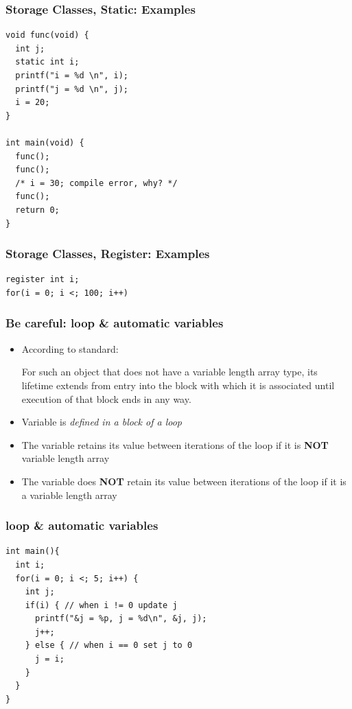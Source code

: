 \documentclass{../c-lecture}
\begin{document}
\begin{frame}[fragile]
  \frametitle{Storage Classes, Static: Examples}
  \scriptsize
  \begin{verbatim}
void func(void) {
  int j;
  static int i;
  printf("i = %d \n", i);
  printf("j = %d \n", j);
  i = 20;
}

int main(void) {
  func();
  func();
  /* i = 30; compile error, why? */
  func();
  return 0;
}
  \end{verbatim}
\end{frame}

\begin{frame}[fragile]
  \frametitle{Storage Classes, Register: Examples}
  \scriptsize
  \begin{verbatim}
register int i;
for(i = 0; i <; 100; i++)
  \end{verbatim}
\end{frame}

\begin{frame}
  \frametitle{Be careful: loop \& automatic variables}
  \begin{itemize}
    \item According to standard:
    \begin{block}{}
      For such an object that does not have a variable length array type, its
      lifetime extends from entry into the block with which it is associated
      until execution of that block ends in any way.
    \end{block}
    \item Variable is \textit{\color{Yellow} defined in a block of a loop}
    \item
      The variable retains its value between iterations of the loop if it is
      \textbf{\color{RubineRed} NOT} variable length array
    \item
      The variable does \textbf{\color{RubineRed} NOT} retain its value between
      iterations of the loop if it is a variable length array
  \end{itemize}
\end{frame}

\begin{frame}[fragile]
  \frametitle{loop \& automatic variables}
  \begin{verbatim}
int main(){
  int i;
  for(i = 0; i <; 5; i++) {
    int j;
    if(i) { // when i != 0 update j
      printf("&j = %p, j = %d\n", &j, j);
      j++;
    } else { // when i == 0 set j to 0
      j = i;
    }
  }
}
  \end{verbatim}
\end{frame}
\end{document}
